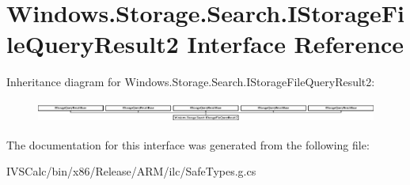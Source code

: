 \hypertarget{interface_windows_1_1_storage_1_1_search_1_1_i_storage_file_query_result2}{}\section{Windows.\+Storage.\+Search.\+I\+Storage\+File\+Query\+Result2 Interface Reference}
\label{interface_windows_1_1_storage_1_1_search_1_1_i_storage_file_query_result2}
Inheritance diagram for Windows.\+Storage.\+Search.\+I\+Storage\+File\+Query\+Result2\+:\begin{figure}[H]
\begin{center}
\leavevmode
\includegraphics[height=0.717949cm]{interface_windows_1_1_storage_1_1_search_1_1_i_storage_file_query_result2}
\end{center}
\end{figure}


The documentation for this interface was generated from the following file\+:\begin{DoxyCompactItemize}
\item 
I\+V\+S\+Calc/bin/x86/\+Release/\+A\+R\+M/ilc/Safe\+Types.\+g.\+cs\end{DoxyCompactItemize}
